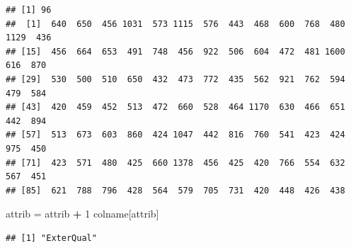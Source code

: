\documentclass[]{article}
\newenvironment{Shaded}{\begin{snugshade}}{\end{snugshade}}
\newcommand{\KeywordTok}[1]{\textcolor[rgb]{0.13,0.29,0.53}{\textbf{#1}}}
\newcommand{\DataTypeTok}[1]{\textcolor[rgb]{0.13,0.29,0.53}{#1}}
\newcommand{\DecValTok}[1]{\textcolor[rgb]{0.00,0.00,0.81}{#1}}
\newcommand{\StringTok}[1]{\textcolor[rgb]{0.31,0.60,0.02}{#1}}
\newcommand{\CommentTok}[1]{\textcolor[rgb]{0.56,0.35,0.01}{\textit{#1}}}
\newcommand{\ControlFlowTok}[1]{\textcolor[rgb]{0.13,0.29,0.53}{\textbf{#1}}}
\newcommand{\OperatorTok}[1]{\textcolor[rgb]{0.81,0.36,0.00}{\textbf{#1}}}
\newcommand{\NormalTok}[1]{#1}
\begin{document}
\begin{verbatim}
## [1] 96
##  [1]  640  650  456 1031  573 1115  576  443  468  600  768  480 1129  436
## [15]  456  664  653  491  748  456  922  506  604  472  481 1600  616  870
## [29]  530  500  510  650  432  473  772  435  562  921  762  594  479  584
## [43]  420  459  452  513  472  660  528  464 1170  630  466  651  442  894
## [57]  513  673  603  860  424 1047  442  816  760  541  423  424  975  450
## [71]  423  571  480  425  660 1378  456  425  420  766  554  632  567  451
## [85]  621  788  796  428  564  579  705  731  420  448  426  438
\end{verbatim}

\begin{Shaded}
\end{Shaded}

\begin{Shaded}
\begin{Highlighting}[]
\NormalTok{attrib =}\StringTok{ }\NormalTok{attrib }\OperatorTok{+}\StringTok{ }\DecValTok{1}
\NormalTok{colname[attrib]}
\end{Highlighting}
\end{Shaded}

\begin{verbatim}
## [1] "ExterQual"
\end{verbatim}
\end{document}
